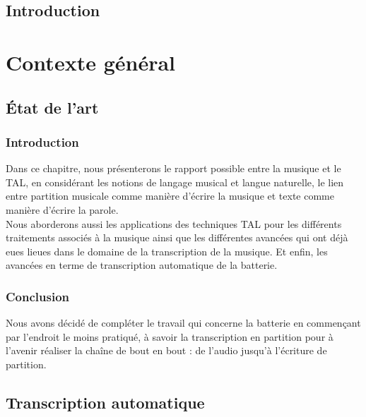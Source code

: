 \documentclass[a4paper,11pt,twoside]{memoir}
\newcommand{\nocontentsline}[3]{}
\newcommand{\tocless}[2]{\bgroup\let\addcontentsline=\nocontentsline#1{#2}\egroup}
\begin{document}
\sloppy
\dominitoc

\newpage
\setcounter{tocdepth}{1}
\tocless\tableofcontents
\newpage
\listoffigures
\listoftables
\printnomenclature
\newpage

\chapter*{Introduction}
\adjustmtc
{} 


\part{Contexte général}
\chapter{\'Etat de l'art}
\label{chap:articles}
\adjustmtc
\minitoc

\section{Introduction}
Dans ce chapitre, nous présenterons le rapport possible entre la musique et le TAL, en considérant les notions de langage musical et langue naturelle, le lien entre partition musicale comme manière d’écrire la musique et texte comme manière d’écrire la parole.\\
Nous aborderons aussi les applications des techniques TAL pour les différents traitements associés à la musique ainsi que les différentes avancées qui ont déjà eues lieues dans le domaine de la transcription de la musique. Et enfin, les avancées en terme de transcription automatique de la batterie.



\section{Conclusion}
Nous avons décidé de compléter le travail qui concerne la batterie en commençant par l’endroit le moins pratiqué, à savoir la transcription en partition pour à l’avenir réaliser la chaîne de bout en bout : de l’audio jusqu’à l’écriture de partition.


\chapter{Transcription automatique}
\label{chap:transcription automatique}
\minitoc
\end{document}
